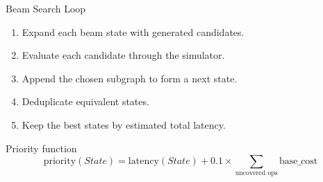 \documentclass[aspectratio=169,professionalfonts]{beamer}
\begin{document}
\begin{frame}{Beam Search Loop}
\begin{enumerate}
\item Expand each beam state with generated candidates.
\item Evaluate each candidate through the simulator.
\item Append the chosen subgraph to form a next state.
\item Deduplicate equivalent states.
\item Keep the best states by estimated total latency.
\end{enumerate}
\begin{block}{Priority function}
\[
\text{priority}(State)=\text{latency}(State)+0.1\times\sum_{\text{uncovered ops}}\text{base\_cost}
\]
\end{block}
\end{frame}
\end{document}

